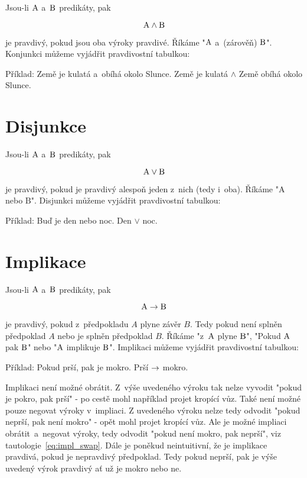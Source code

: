 Jsou-li \(\mathrm{A}\) a~\(\mathrm{B}\) predikáty, pak

\begin{equation}
\mathrm{A} \land \mathrm{B} 
\end{equation}

je pravdivý, pokud jsou oba výroky pravdivé. Říkáme "\(\mathrm{A}\) a~(zárověň) \(\mathrm{B}\)".
Konjunkci můžeme vyjádřit pravdivostní tabulkou:


Příklad: Země je kulatá a~obíhá okolo Slunce. Země je kulatá \(\land\) Země obíhá okolo Slunce.


\section{Disjunkce}

Jsou-li \(\mathrm{A}\) a~\(\mathrm{B}\) predikáty, pak

\begin{equation}
\mathrm{A} \lor \mathrm{B}
\end{equation}

je pravdivý, pokud je pravdivý alespoň jeden z~nich (tedy i~oba). Říkáme "\(\mathrm{A}\) nebo \(\mathrm{B}\)".
Disjunkci můžeme vyjádřit pravdivostní tabulkou:


Příklad: Buď je den nebo noc. Den \(\lor\) noc.

\section{Implikace}

Jsou-li \(\mathrm{A}\) a~\(\mathrm{B}\) predikáty, pak

\begin{equation}
\mathrm{A} \rightarrow \mathrm{B}
\end{equation}

je pravdivý, pokud z~předpokladu \(A\) plyne závěr \(B\). Tedy pokud není splněn předpoklad \(A\) nebo je splněn předpoklad \(B\). Říkáme "z~\(\mathrm{A}\) plyne \(\mathrm{B}\)", "Pokud \(\mathrm{A}\) pak \(\mathrm{B}\)" nebo "\(\mathrm{A}\) implikuje \(\mathrm{B}\)".
Implikaci můžeme vyjádřit pravdivostní tabulkou:


Příklad: Pokud prší, pak je mokro. Prší \(\rightarrow\) mokro.

Implikaci není možné obrátit. Z~výše uvedeného výroku tak nelze vyvodit "pokud je pokro, pak prší" - po cestě mohl například projet kropící vůz. Také není možné pouze negovat výroky v~impliaci. Z uvedeného výroku nelze tedy odvodit "pokud neprší, pak není mokro" - opět mohl projet kropící vůz. Ale je možné impliaci obrátit~a~negovat výroky, tedy odvodit "pokud není mokro, pak neprší", viz tautologie~\eqref{eq:impl_swap}. Dále je poněkud neintuitivní, že je implikace pravdivá, pokud je nepravdivý předpoklad. Tedy pokud neprší, pak je výše uvedený výrok pravdivý ať už je mokro nebo ne. 

